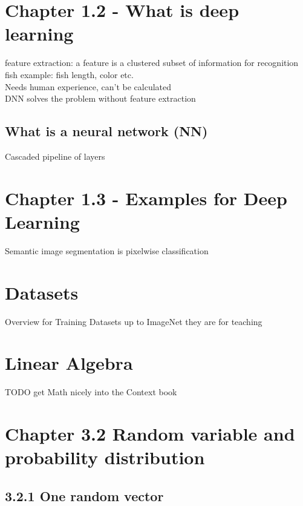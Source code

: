 \section{Chapter 1.2 - What is deep learning}

\textbullet feature extraction: a feature is a clustered subset of information for recognition \\
\textbullet fish example: fish length, color etc. \\
\qquad \textbullet Needs human experience, can't be calculated \\
\qquad \textbullet DNN solves the problem without feature extraction
\subsection{What is a neural network (NN)}

\textbullet Cascaded pipeline of layers \\
\section{Chapter 1.3 - Examples for Deep Learning}
\textbullet Semantic image segmentation is pixelwise classification

\section{Datasets}
\textbullet Overview for Training Datasets up to ImageNet they are for teaching

\section{Linear Algebra}
\textbullet TODO get Math nicely into the Context book \\
\section{Chapter 3.2 Random variable and probability distribution}

\subsection{3.2.1 One random vector}
 \\

